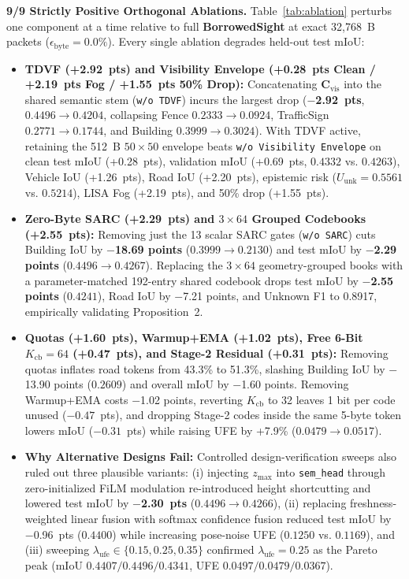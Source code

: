 \documentclass[journal]{IEEEtran}
\begin{document}
\textbf{9/9 Strictly Positive Orthogonal Ablations.} Table~\ref{tab:ablation} perturbs one component at a time relative to full \textbf{BorrowedSight} at exact 32,768~B packets ($\epsilon_{\mathrm{byte}} = 0.0\%$). Every single ablation degrades held-out test mIoU:
\begin{itemize}
\item \textbf{TDVF (+2.92~pts) and Visibility Envelope (+0.28~pts Clean / +2.19~pts Fog / +1.55~pts 50\% Drop):} Concatenating $\mathbf{C}_{\mathrm{vis}}$ into the shared semantic stem (\texttt{w/o TDVF}) incurs the largest drop (\textbf{$-$2.92~pts}, $0.4496 \to 0.4204$, collapsing Fence $0.2333 \to 0.0924$, TrafficSign $0.2771 \to 0.1744$, and Building $0.3999 \to 0.3024$). With TDVF active, retaining the 512~B $50\times 50$ envelope beats \texttt{w/o Visibility Envelope} on clean test mIoU (+0.28~pts), validation mIoU (+0.69~pts, $0.4332$ vs. $0.4263$), Vehicle IoU (+1.26~pts), Road IoU (+2.20~pts), epistemic risk ($U_{\mathrm{unk}} = 0.5561$ vs. $0.5214$), LISA Fog (+2.19~pts), and 50\% drop (+1.55~pts).
\item \textbf{Zero-Byte SARC (+2.29~pts) and $3\times 64$ Grouped Codebooks (+2.55~pts):} Removing just the 13 scalar SARC gates (\texttt{w/o SARC}) cuts Building IoU by \textbf{$-$18.69 points} ($0.3999 \to 0.2130$) and test mIoU by \textbf{$-$2.29 points} ($0.4496 \to 0.4267$). Replacing the $3\times 64$ geometry-grouped books with a parameter-matched 192-entry shared codebook drops test mIoU by \textbf{$-$2.55 points} ($0.4241$), Road IoU by $-$7.21 points, and Unknown F1 to 0.8917, empirically validating Proposition~2.
\item \textbf{Quotas (+1.60~pts), Warmup+EMA (+1.02~pts), Free 6-Bit $K_{\mathrm{cb}}=64$ (+0.47~pts), and Stage-2 Residual (+0.31~pts):} Removing quotas inflates road tokens from 43.3\% to 51.3\%, slashing Building IoU by $-$13.90 points ($0.2609$) and overall mIoU by $-$1.60 points. Removing Warmup+EMA costs $-$1.02 points, reverting $K_{\mathrm{cb}}$ to 32 leaves 1 bit per code unused ($-0.47$~pts), and dropping Stage-2 codes inside the same 5-byte token lowers mIoU ($-0.31$~pts) while raising UFE by +7.9\% ($0.0479 \to 0.0517$).
\item \textbf{Why Alternative Designs Fail:} Controlled design-verification sweeps also ruled out three plausible variants: (i) injecting $z_{\max}$ into \texttt{sem\_head} through zero-initialized FiLM modulation re-introduced height shortcutting and lowered test mIoU by \textbf{$-$2.30~pts} ($0.4496 \to 0.4266$), (ii) replacing freshness-weighted linear fusion with softmax confidence fusion reduced test mIoU by $-$0.96~pts ($0.4400$) while increasing pose-noise UFE ($0.1250$ vs. $0.1169$), and (iii) sweeping $\lambda_{\mathrm{ufe}} \in \{0.15, 0.25, 0.35\}$ confirmed $\lambda_{\mathrm{ufe}} = 0.25$ as the Pareto peak (mIoU $0.4407 / \mathbf{0.4496} / 0.4341$, UFE $0.0497 / 0.0479 / 0.0367$).
\end{itemize}
\end{document}
